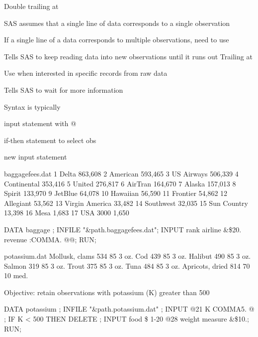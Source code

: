 \begin{frame}
Double trailing at 
\bi
\item SAS assumes that a single line of data corresponds to a single observation
\item If a single line of a data corresponds to multiple observations, need to use 
\item Tells SAS to keep reading data into new observations until it runs out
\ei
\emp
{} \hspace{0.05in}\emp
{}
Trailing at 
\bi
\item Use when interested in specific records from raw data
\item Tells SAS to wait for more information
\item Syntax is typically
\bi
    \item input statement with @
    \item if-then statement to select obs
    \item new input statement
\ei
\ei
\emp
\end{frame}


\begin{frame}[fragile]
\begin{craw}{.0}{baggagefees.dat}
1  Delta  863,608  2  American  593,465
3  US Airways  506,339  4  Continental  353,416
5  United  276,817  6  AirTran  164,670
7  Alaska  157,013  8  Spirit  133,970
9  JetBlue  64,078  10  Hawaiian  56,590
11  Frontier  54,862  12  Allegiant  53,562
13  Virgin America  33,482  14  Southwest  32,035
15  Sun Country  13,398  16  Mesa  1,683
17  USA 3000  1,650
\end{craw}
\vskip3pt
\begin{code}{.0}
DATA baggage ;
   INFILE "\&path.baggagefees.dat";
   INPUT rank airline \&\$20. revenue :COMMA. @@;
RUN;
\end{code}
\emp
\end{frame}


\begin{frame}[fragile]
\begin{craw}{.0}{potassium.dat}
Mollusk, clams        534  85  3 oz.
Cod                   439  85  3 oz.
Halibut               490  85  3 oz.
Salmon                319  85  3 oz.
Trout                 375  85  3 oz.
Tuna                  484  85  3 oz.
Apricots, dried       814  70  10 med.
\end{craw}
\emp
\blankcolumn
{}
Objective: retain observations with potassium (K) greater than 500
\emp
\vskip3pt
\begin{code}{.0}
DATA potassium ;
   INFILE "\&path.potassium.dat" ;
   INPUT @21 K COMMA5. @ ;
   IF K < 500 THEN DELETE ;
   INPUT food \$ 1-20 @28 weight measure \&\$10.;
RUN;
\end{code}
\emp
\end{frame}

